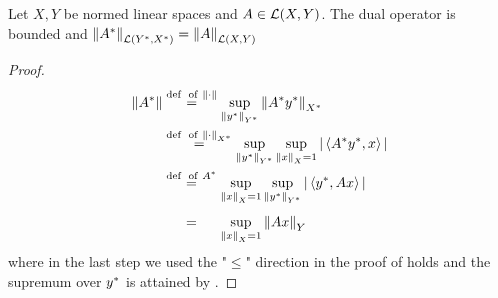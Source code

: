 \documentclass{article}
\begin{document}
\begin{theorem}
Let $X,Y$ be normed linear spaces and $A \in \mathcal{L}({X},{Y})$. The dual operator  is bounded and $\left\|{{A}^*}\right\|_{\mathcal{L}({{Y}^*},{{X}^*})}=\left\|{A}\right\|_{\mathcal{L}({X},{Y})}$
\end{theorem}  

\begin{proof}
\begin{align*}
    \norm{\dual{A}} &\stackrel{\textrm{def \ of} \ \norm{\cdot}}{=} \sup_{\norm{\dual{y}}_{\dual{Y}}} \norm{\dual{A} \dual{y}}_{\dual{X}} \\
    &\stackrel{\textrm{def \ of} \  \norm{\cdot}_{\dual{X}}}{=} \sup_{\norm{\dual{y}}_{\dual{Y}}} \sup_{\norm{x}_X=1} |\inne{\dual{A}\dual{y}}{x}| \\
    &\stackrel{\textrm{def \ of} \ \dual{A}}{=} \sup_{\norm{x}_X=1}  \sup_{\norm{\dual{y}}_{\dual{Y}}}  |\inne{\dual{y}}{Ax}| \\
    &\stackrel{\phantom{\textrm{def \ of} \ \dual{A}}}{=} \sup_{\norm{x}_X=1} \norm{Ax}_Y
\end{align*}
where in the last step we used the "$\leq$" direction in the proof of  holds and the supremum over ${y}^*$ is attained by .  
\end{proof}
\end{document}
